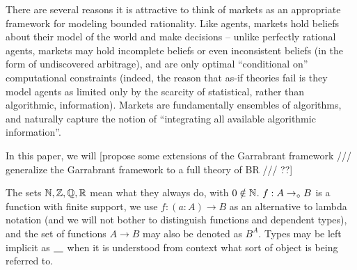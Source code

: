 There are several reasons it is attractive to think of markets as an appropriate framework for modeling bounded rationality. Like agents, markets hold beliefs about their model of the world and make decisions -- unlike perfectly rational agents, markets may hold incomplete beliefs or even inconsistent beliefs (in the form of undiscovered arbitrage), and are only optimal ``conditional on'' computational constraints (indeed, the reason that as-if theories \cite{rationalization_discounting, rationalization_inattention, rationalization_inattention_2} fail is they model agents as limited only by the scarcity of statistical, rather than algorithmic, information). Markets are fundamentally ensembles of algorithms, and naturally capture the notion of ``integrating all available algorithmic information''. 

In this paper, we will [propose some extensions of the Garrabrant framework /// generalize the Garrabrant framework to a full theory of BR /// ??] 

\begin{notation}
    The sets $\mathbb{N},\mathbb{Z},\mathbb{Q},\mathbb{R}$ mean what they always do, with $0\notin\mathbb{N}$. $f:A\to_\circ B$ is a function with finite support, we use $f:(a:A)\to B$ as an alternative to lambda notation (and we will not bother to distinguish functions and dependent types), and the set of functions $A\to B$ may also be denoted as $B^A$. Types may be left implicit as $\underline{\quad}$ when it is understood from context what sort of object is being referred to.
\end{notation}